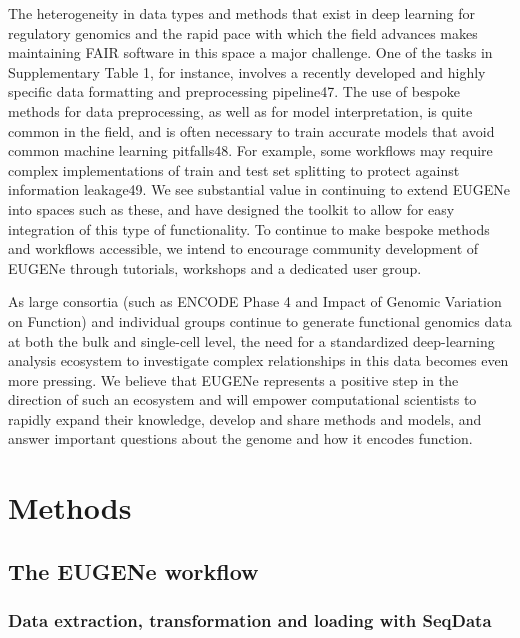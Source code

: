 The heterogeneity in data types and methods that exist in deep learning for regulatory genomics and the rapid pace with which the field advances makes maintaining FAIR software in this space a major challenge. One of the tasks in Supplementary Table 1, for instance, involves a recently developed and highly specific data formatting and preprocessing pipeline47. The use of bespoke methods for data preprocessing, as well as for model interpretation, is quite common in the field, and is often necessary to train accurate models that avoid common machine learning pitfalls48. For example, some workflows may require complex implementations of train and test set splitting to protect against information leakage49. We see substantial value in continuing to extend EUGENe into spaces such as these, and have designed the toolkit to allow for easy integration of this type of functionality. To continue to make bespoke methods and workflows accessible, we intend to encourage community development of EUGENe through tutorials, workshops and a dedicated user group.

As large consortia (such as ENCODE Phase 4 and Impact of Genomic Variation on Function) and individual groups continue to generate functional genomics data at both the bulk and single-cell level, the need for a standardized deep-learning analysis ecosystem to investigate complex relationships in this data becomes even more pressing. We believe that EUGENe represents a positive step in the direction of such an ecosystem and will empower computational scientists to rapidly expand their knowledge, develop and share methods and models, and answer important questions about the genome and how it encodes function.

\section{Methods}

\subsection{The EUGENe workflow}

\subsubsection{Data extraction, transformation and loading with SeqData}

